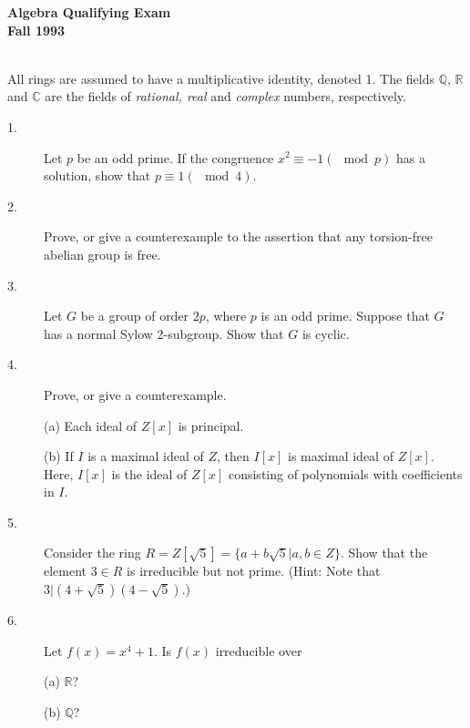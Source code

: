 \documentclass{article}
\def\R{\mathbb R}
\def\C{\mathbb C}
\def\Q{\mathbb Q}
\begin{document}



\begin{center}\begin{LARGE}
{\bf Algebra Qualifying Exam}\\ 
{\bf Fall 1993}\\ \end{LARGE}
\end{center}
\vspace{0.1in}
\noindent\hrulefill\\
All rings are assumed to have a multiplicative identity, denoted 1. The
fields $\Q$, $\R$ and $\C$ are the fields of {\it rational, real} and
{\it complex} numbers, respectively.

\begin{description}

\item[1.]
Let $p$ be an odd prime. If the congruence $x^2 \equiv -1 (\mod p)$
has a solution, show that $p \equiv 1(\mod 4)$.

\item[2.]
Prove, or give a counterexample to the assertion that any torsion-free
abelian group is free.

\item[3.]
Let $G$ be a group of order $2p$, where $p$ is an odd prime. Suppose that
$G$ has a normal Sylow 2-subgroup. Show that $G$ is cyclic.

\item[4.]
Prove, or give a counterexample.

\item[\quad] (a)
Each ideal of $Z[x]$ is principal.

\item[\quad] (b)
If $I$ is a maximal ideal of $Z$, then $I[x]$ is maximal ideal of
$Z[x]$. Here, $I[x]$ is the ideal of $Z[x]$ consisting of polynomials
with  coefficients in $I$.

\item[5.]
Consider the ring $R=Z[\sqrt{5}] = \{a + b \sqrt{5} | a,b \in Z\}$.
Show that the element $3 \in R$ is irreducible but not prime. (Hint: Note
that $3|(4+ \sqrt{5}) (4 - \sqrt{5})$.)

\item[6.]
Let $f(x) = x^4 + 1$. Is $f(x)$ irreducible over

\item[\quad] (a)
$\R$?

\item[\quad] (b)
$\Q$?


\end{description}
\end{document}
